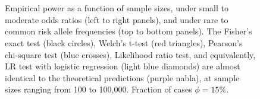 \begin{figure}[!tpb]
{        }\\ %
        \\ %
\caption{Empirical power as a function of sample sizes, under small to moderate odds ratios (left to right panels), and under rare to common risk allele frequencies (top to bottom panels).
The Fisher's exact test (black circles), Welch's t-test (red triangles), Pearson's chi-square test (blue crosses), Likelihood ratio test, and equivalently, LR test with logistic regression (light blue diamonds) are almost identical to the theoretical predictions (purple nabla), at sample sizes ranging from 100 to 100,000. Fraction of cases $\phi = 15\%$.
}\label{fig:compare-phi015}
\end{figure}


